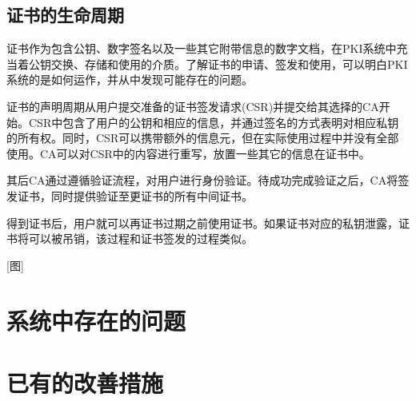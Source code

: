 \subsection{证书的生命周期}

证书作为包含公钥、数字签名以及一些其它附带信息的数字文档，在PKI系统中充当着公钥交换、存储和使用的介质。了解证书的申请、签发和使用，可以明白PKI系统的是如何运作，并从中发现可能存在的问题。

证书的声明周期从用户提交准备的证书签发请求(CSR)并提交给其选择的CA开始。CSR中包含了用户的公钥和相应的信息，并通过签名的方式表明对相应私钥的所有权。同时，CSR可以携带额外的信息元，但在实际使用过程中并没有全部使用。CA可以对CSR中的内容进行重写，放置一些其它的信息在证书中。

其后CA通过遵循验证流程，对用户进行身份验证。待成功完成验证之后，CA将签发证书，同时提供验证至更证书的所有中间证书。

得到证书后，用户就可以再证书过期之前使用证书。如果证书对应的私钥泄露，证书将可以被吊销，该过程和证书签发的过程类似。


[图]

\section{系统中存在的问题}

\section{已有的改善措施}

